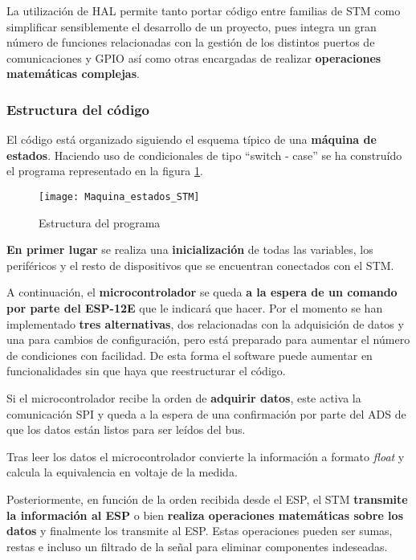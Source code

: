 La utilización de \acrshort{HAL} permite tanto portar código entre familias de STM como simplificar sensiblemente el desarrollo de un proyecto, pues integra un gran número de funciones relacionadas con la gestión de los distintos puertos de comunicaciones y GPIO así como otras encargadas de realizar \textbf{operaciones matemáticas complejas}.

\subsubsection{Estructura del código\label{sec:Software_micro_estados}}

El código está organizado siguiendo el esquema típico de una \textbf{máquina de estados}. Haciendo uso de condicionales de tipo ``switch - case'' se ha construído el programa representado en la figura \ref{fig:Maquina_estados_STM}. 

\begin{figure} [h]
    \centering
    \texttt{[image: Maquina\_estados\_STM]}
    \caption{Estructura del programa}
    \label{fig:Maquina_estados_STM}
\end{figure}

\textbf{En primer lugar} se realiza una \textbf{inicialización} de todas las variables, los periféricos y el resto de dispositivos que se encuentran conectados con el STM.

A continuación, el \textbf{microcontrolador} se queda \textbf{a la espera de un comando por parte del ESP-12E} que le indicará que hacer. Por el momento se han implementado \textbf{tres alternativas}, dos relacionadas con la adquisición de datos y una para cambios de   configuración, pero está preparado para aumentar el número de condiciones con facilidad. De esta forma el software puede aumentar en funcionalidades sin que haya que reestructurar el código.

Si el microcontrolador recibe la orden de \textbf{adquirir datos}, este activa la comunicación SPI y queda a la espera de una confirmación por parte del ADS de que los datos están listos para ser leídos del bus.

Tras leer los datos el microcontrolador convierte la información a formato \textit{float} y calcula la equivalencia en voltaje de la medida. 

Posteriormente, en función de la orden recibida desde el ESP, el STM \textbf{transmite la información al ESP} o bien \textbf{realiza operaciones matemáticas sobre los datos} y finalmente los transmite al ESP. Estas operaciones pueden ser sumas, restas e incluso un filtrado de la señal para eliminar componentes indeseadas.

